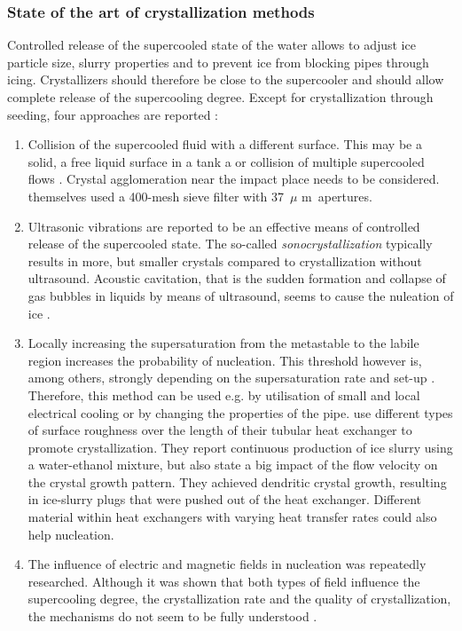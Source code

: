 \subsubsection{State of the art of crystallization methods}
Controlled release of the supercooled state of the water allows to adjust ice particle size, slurry properties and to prevent ice from blocking pipes through icing. Crystallizers should therefore be close to the supercooler and should allow complete release of the supercooling degree. Except for crystallization through seeding, four approaches are reported \citep{wang_investigation_2016, zhang_overview_2012}:

\begin{enumerate}
  \item Collision of the supercooled fluid with a different surface. This may be a solid, a free liquid surface in a tank a or collision of multiple supercooled flows \citep{bedecarrats_ice_2010}. Crystal agglomeration near the impact place needs to be considered. \cite{wang_investigation_2016} themselves used a 400-mesh sieve filter with \SI{37}{$\mu$ m} apertures.  
  \item Ultrasonic vibrations are reported to be an effective means of controlled release of the supercooled state. The so-called \emph{sonocrystallization} typically results in more, but smaller crystals compared to crystallization without ultrasound. Acoustic cavitation, that is the sudden formation and collapse of gas bubbles in liquids by means of ultrasound, seems to cause the nuleation of ice \citep{baillon_28_2015}.
  \item Locally increasing the supersaturation from the metastable to the labile region increases the probability of nucleation. This threshold however is, among others, strongly depending on the supersaturation rate and set-up \citep{mullin_crystallization_2001}. Therefore, this method can be used e.g. by utilisation of small and local electrical cooling or by changing the properties of the pipe. \cite{le_bail_ice_2015} use different types of surface roughness over the length of their tubular heat exchanger to promote crystallization. They report continuous production of ice slurry using a water-ethanol mixture, but also state a big impact of the flow velocity on the crystal growth pattern. They achieved dendritic crystal growth, resulting in ice-slurry plugs that were pushed out of the heat exchanger. Different material within heat exchangers with varying heat transfer rates could also help nucleation.
  \item The influence of electric and magnetic fields in nucleation was repeatedly researched. Although it was shown that both types of field influence the supercooling degree, the crystallization rate and the quality of crystallization, the mechanisms do not seem to be fully understood \citep{dalvi-isfahan_review_2017}.
\end{enumerate}


